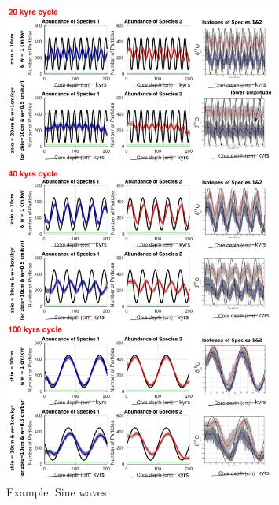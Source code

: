 \documentclass[a4paper,oneside,9pt]{article}
\begin{document}
\begin{figure}[hbp]
\begin{center}
	\includegraphics[width=0.8\textwidth]{../figures/../figures/20+40+100kyrcycle_10+20cm_background.pdf}
	\caption{Example: Sine waves.}\label{fig:5pointevent}
\end{center}
\end{figure}
\end{document}
